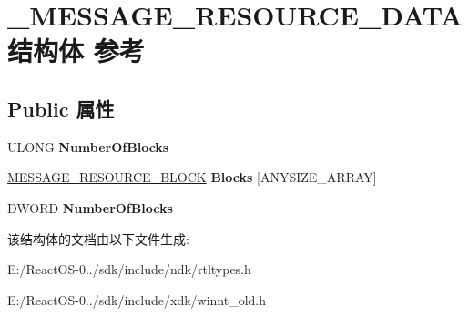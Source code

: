 \hypertarget{struct___m_e_s_s_a_g_e___r_e_s_o_u_r_c_e___d_a_t_a}{}\section{\+\_\+\+M\+E\+S\+S\+A\+G\+E\+\_\+\+R\+E\+S\+O\+U\+R\+C\+E\+\_\+\+D\+A\+T\+A结构体 参考}
\label{struct___m_e_s_s_a_g_e___r_e_s_o_u_r_c_e___d_a_t_a}
\subsection*{Public 属性}
\begin{DoxyCompactItemize}
\item 
\mbox{\label{struct___m_e_s_s_a_g_e___r_e_s_o_u_r_c_e___d_a_t_a_aefa6c7331f0ac68c3ebf7bb9d534bec2}} 
U\+L\+O\+NG {\bfseries Number\+Of\+Blocks}
\item 
\mbox{\label{struct___m_e_s_s_a_g_e___r_e_s_o_u_r_c_e___d_a_t_a_ab9cf10b06c15b1db6a1e5b0aa72907d0}} 
\hyperlink{struct___m_e_s_s_a_g_e___r_e_s_o_u_r_c_e___b_l_o_c_k}{M\+E\+S\+S\+A\+G\+E\+\_\+\+R\+E\+S\+O\+U\+R\+C\+E\+\_\+\+B\+L\+O\+CK} {\bfseries Blocks} \mbox{[}A\+N\+Y\+S\+I\+Z\+E\+\_\+\+A\+R\+R\+AY\mbox{]}
\item 
\mbox{\label{struct___m_e_s_s_a_g_e___r_e_s_o_u_r_c_e___d_a_t_a_aca7a2e5457f4e168b4a3df90eeb26ec0}} 
D\+W\+O\+RD {\bfseries Number\+Of\+Blocks}
\end{DoxyCompactItemize}


该结构体的文档由以下文件生成\+:\begin{DoxyCompactItemize}
\item 
E\+:/\+React\+O\+S-\/0../sdk/include/ndk/rtltypes.\+h\item 
E\+:/\+React\+O\+S-\/0../sdk/include/xdk/winnt\+\_\+old.\+h\end{DoxyCompactItemize}
